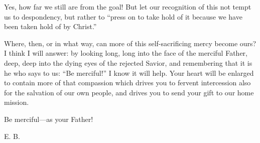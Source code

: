 Yes, how far we still are from the goal! But let our recognition of this not tempt us to despondency, but rather to “press on to take hold of it because we have been taken hold of by Christ.”

Where, then, or in what way, can more of this self-sacrificing mercy become ours? I think I will answer: by looking long, long into the face of the merciful Father, deep, deep into the dying eyes of the rejected Savior, and remembering that it is he who says to us: “Be merciful!” I know it will help. Your heart will be enlarged to contain more of that compassion which drives you to fervent intercession also for the salvation of our own people, and drives you to send your gift to our home mission.

Be merciful—as your Father!

E. B.
